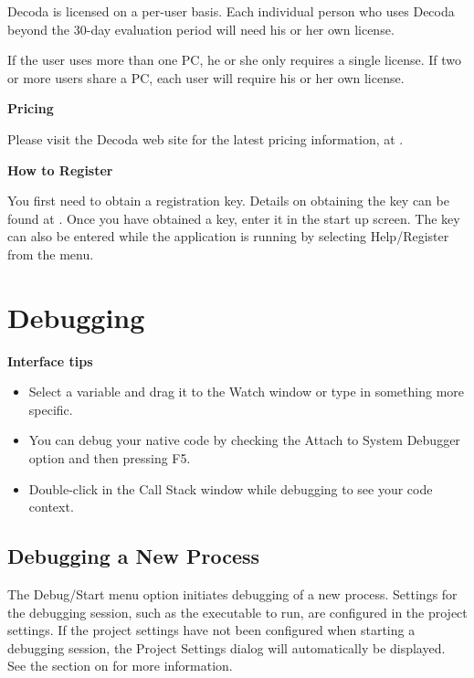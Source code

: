 Decoda is licensed on a per-user basis.  Each individual person who uses Decoda
beyond the 30-day evaluation period will need his or her own license.

If the user uses more than one PC, he or she only requires a single license. If two or
more users share a PC, each user will require his or her own license.

\textbf{Pricing}

Please visit the Decoda web site for the latest pricing information, at
. 

\textbf{How to Register}

You first need to obtain a registration key. Details on obtaining the key can be found
at .
Once you have obtained a key, enter it in the start up screen.  The key can also be
entered while the application is running by selecting Help/Register from the menu. 

\chapter{Debugging}\label{debugging}

\textbf{Interface tips}
\begin{itemize}
\item Select a variable and drag it to the Watch window or type in something more specific.
\item You can debug your native code by checking the Attach to System Debugger option and then pressing F5.
\item Double-click in the Call Stack window while debugging to see your code context.
\end{itemize}

\section{Debugging a New Process}\label{debugging_new}

The Debug/Start menu option initiates debugging of a new process.  Settings for the debugging
session, such as the executable to run, are configured in the project settings. If the project
settings have not been configured when starting a debugging session, the Project Settings dialog
will automatically be displayed. See the section on 
for more information.

